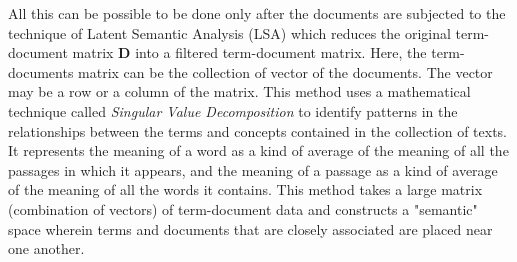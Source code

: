 \documentclass[12pt]{article}
\begin{document}
        All this can be possible to be done only after the documents are subjected to the technique of Latent Semantic Analysis (LSA)\cite{deerwester1990indexing} 
        which reduces the
        original term-document matrix \textbf{D} into a filtered term-document matrix. Here, the term-documents matrix can be the collection of vector of the documents. 
        The vector may be a row or a column of the matrix. 
        This method uses a mathematical technique called \emph{Singular Value Decomposition} to identify patterns in the relationships between the terms and 
        concepts contained in the collection of texts. It represents the meaning of a word as a kind of average of the meaning of all the passages in which it appears, 
        and the meaning of a passage as a kind of average of the meaning of all the words it contains\cite{landauer1998introduction}. 
        This method takes a large matrix (combination of vectors) of term-document data and constructs a "semantic" space wherein terms and documents that are closely associated 
        are placed near one another. 
        
\end{document}

